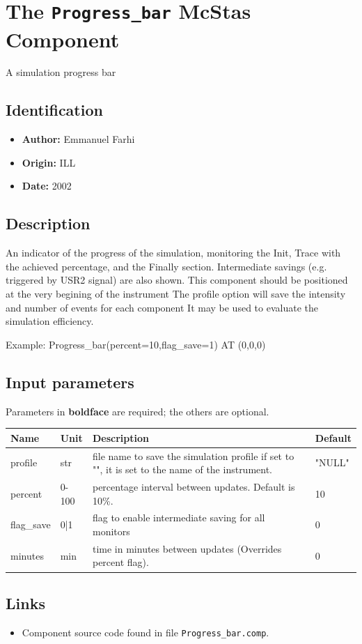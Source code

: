 \section{The \texttt{Progress\_bar} McStas Component}
A simulation progress bar

\subsection*{Identification}
\begin{itemize}
  \item \textbf{Author:} Emmanuel Farhi
  \item \textbf{Origin:} ILL
  \item \textbf{Date:} 2002
\end{itemize}

\subsection*{Description}
An indicator of the progress of the simulation, monitoring the Init, Trace with the achieved percentage, and the Finally section. Intermediate savings (e.g. triggered by USR2 signal) are also shown. This component should be positioned at the very begining of the instrument The profile option will save the intensity and number of events for each component It may be used to evaluate the simulation efficiency.

Example: Progress\_bar(percent=10,flag\_save=1) AT (0,0,0)

\subsection*{Input parameters}
Parameters in \textbf{boldface} are required; the others are optional.

\begin{longtable}{p{}p{}p{}p{}}
\toprule
\textbf{Name} & \textbf{Unit} & \textbf{Description} & \textbf{Default} \\
\midrule
\endhead
profile & str & file name to save the simulation profile if set to "", it is set to the name of the instrument. & "NULL" \\
percent & 0-100 & percentage interval between updates. Default is 10\%. & 10 \\
flag\_save & 0|1 & flag to enable intermediate saving for all monitors & 0 \\
minutes & min & time in minutes between updates (Overrides percent flag). & 0 \\
\bottomrule
\end{longtable}

\subsection*{Links}
\begin{itemize}
  \item Component source code found in file \texttt{Progress\_bar.comp}.
\end{itemize}
